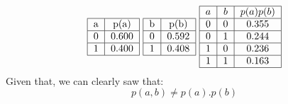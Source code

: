 \documentclass{article}
\begin{document}
                \[
                    \begin{tabular}{|c|c|}
                        \hline
                        a&p(a)\\
                        \hline
                        0&0.600\\
                        \hline
                        1&0.400\\
                        \hline
                    \end{tabular}
                    \text{ }
                    \begin{tabular}{|c|c|}
                        \hline
                        b&p(b)\\
                        \hline
                        0&0.592\\
                        \hline
                        1&0.408\\
                        \hline
                    \end{tabular}
                    \text{ }
                    \begin{tabular}{|c|c|c|}
                        \hline
                        $a$&$b$&$p(a)p(b)$\\
                        \hline
                        0&0&0.355\\
                        \hline
                        0&1&0.244\\
                        \hline
                        1&0&0.236\\
                        \hline
                        1&1&0.163\\
                        \hline
                    \end{tabular}
                \]
                Given that, we can clearly saw that:
                \[
                    p(a, b)\ne p(a).p(b)
                \]
\end{document}
